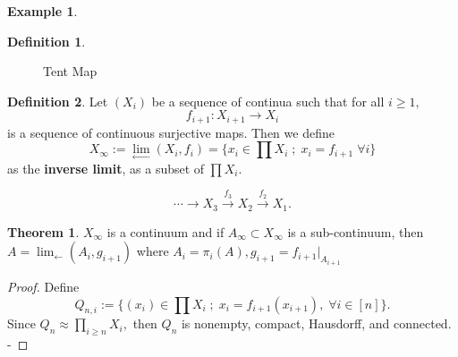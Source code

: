 \documentclass[10pt, oneside]{article}
\theoremstyle{definition}
\newtheorem{exmp}{Example}[section]
\newtheorem{thm}{Theorem}
\newtheorem{defn}{Definition}
\begin{document}
\begin{exmp}
\begin{defn}
\begin{figure}[H]
        \caption{Tent Map}
    \end{figure}
\end{defn}
\begin{defn}
    Let $(X_i)$ be a sequence of continua such that for all $i\geq 1,$ 
    \[f_{i+1}: X_{i+1}\to X_i\] is a sequence of continuous surjective maps. Then we define 
    \[X_\infty := \lim_{\leftarrow}(X_i, f_i) = \{x_i \in \prod X_i \; ; \; x_i = f_{i+1}\; \forall i\}\] as the \textbf{inverse limit}, as a subset of $\prod X_i.$ 
\end{defn}
 \[ \cdots \xrightarrow{} X_3 \xrightarrow{f_3} X_2 \xrightarrow{f_2} X_1.\] 
 \begin{thm}
     $X_\infty$ is a continuum and if $A_\infty \subset X_\infty$ is a sub-continuum, then $A = \lim_{\leftarrow}(A_i, g_{i+1})$ where $A_i = \pi_i(A), g_{i+1} = f_{i+1} |_{A_{i+1}}$
 \end{thm}
 \begin{proof}
     Define 
     \[Q_{n,i} := \{(x_i) \in \prod X_i \; ; \; x_i = f_{i+1}(x_{i+1}), \; \forall i \in [n]\}.\] Since $Q_n \approx \prod_{i\geq n} X_i,$ then $Q_n$ is nonempty, compact, Hausdorff, and connected. -
 \end{proof}
 
\end{exmp}

\newpage
\end{document}
